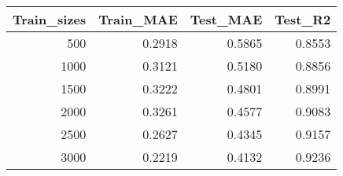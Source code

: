 \begin{tabular}{rrrr}
\toprule
Train_sizes & Train_MAE & Test_MAE & Test_R2 \\
\midrule
500 & 0.2918 & 0.5865 & 0.8553 \\
1000 & 0.3121 & 0.5180 & 0.8856 \\
1500 & 0.3222 & 0.4801 & 0.8991 \\
2000 & 0.3261 & 0.4577 & 0.9083 \\
2500 & 0.2627 & 0.4345 & 0.9157 \\
3000 & 0.2219 & 0.4132 & 0.9236 \\
\bottomrule
\end{tabular}
